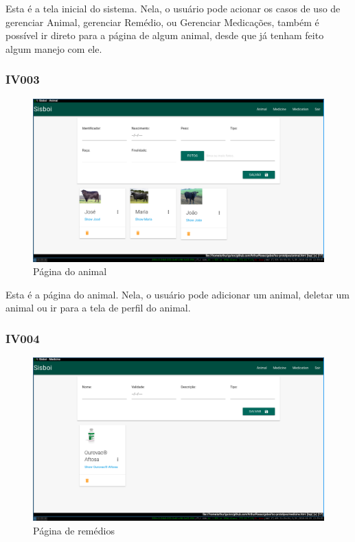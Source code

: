 \documentclass[12pt]{article}
\begin{document}
    Esta é a tela inicial do sistema. Nela, o usuário pode acionar os casos de uso de gerenciar Animal, gerenciar Remédio, ou Gerenciar Medicações, também é possível ir direto para a página de algum animal, desde que já tenham feito algum manejo com ele.

	\newpage

	\subsubsection{IV003}

	\begin{figure}[!h]
		\begin{center}
			\caption{Página do animal}
			\includegraphics[width=13cm]{img/prototipos/animal.png}


		\end{center}
	\end{figure}

Esta é a página do animal. Nela, o usuário pode adicionar um animal, deletar um animal ou ir para a tela de perfil do animal.

	\subsubsection{IV004}

	\begin{figure}[!h]
		\begin{center}
			\caption{Página de remédios}
			\includegraphics[width=13cm]{img/prototipos/remedio.png}


		\end{center}
	\end{figure}
    
\end{document}
